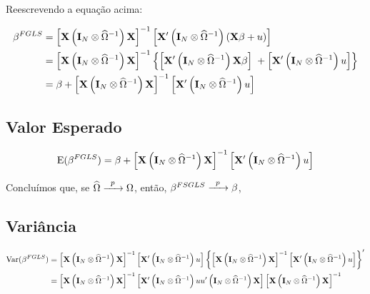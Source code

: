 \documentclass[11pt, oneside, a4paper, article]{article}
\numberwithin{equation}{section}
\begin{document}
\begin{description}
Reescrevendo a equação acima:

\vspace{-1.5 em}
\begin{align*}
\beta^{FGLS}
&= 
\left[  \mathbf{X} \left( \mathbf{I}_{N} \otimes \widehat{\Omega}^{-1} \right) \mathbf{X} \right]^{-1}
\left[  \mathbf{X}' \left( \mathbf{I}_{N} \otimes \widehat{\Omega}^{-1} \right) (\mathbf{X} \beta + u) \right]
\\
&= 
\left[ \mathbf{X} \left( \mathbf{I}_{N} \otimes \widehat{\Omega}^{-1} \right) \mathbf{X} \right]^{-1}
\left\{ 
\left[ \mathbf{X}' \left( \mathbf{I}_{N} \otimes \widehat{\Omega}^{-1} \right) \mathbf{X} \beta \right]
\; +
\left[ \mathbf{X}' \left( \mathbf{I}_{N} \otimes \widehat{\Omega}^{-1} \right) u \right]
\right\}
\\
&= 
\beta +
\left[ \mathbf{X} \left( \mathbf{I}_{N} \otimes \widehat{\Omega}^{-1} \right) \mathbf{X} \right]^{-1}
\left[ \mathbf{X}' \left( \mathbf{I}_{N} \otimes \widehat{\Omega}^{-1} \right) u \right]
\end{align*}

\subsection{Valor Esperado}

\vspace{-1 em}
\begin{align*}
\text{E}(\beta^{FGLS})
= 
\beta +
\left[ \mathbf{X} \left( \mathbf{I}_{N} \otimes \widehat{\Omega}^{-1} \right) \mathbf{X} \right]^{-1}
\left[ \mathbf{X}' \left( \mathbf{I}_{N} \otimes \widehat{\Omega}^{-1} \right) u \right]
\end{align*}

Concluímos que, se 
$\widehat{\Omega} \xrightarrow{\enskip p \enskip} \Omega$,
então,
$\beta^{FSGLS} \xrightarrow{\enskip p \enskip} \beta$,

\subsection{Variância}

\vspace{-1 em}
\begin{align*}
\text{Var}(\beta^{FGLS})
&= 
\left[ \mathbf{X} \left( \mathbf{I}_{N} \otimes \widehat{\Omega}^{-1} \right) \mathbf{X} \right]^{-1}
\left[ \mathbf{X}' \left( \mathbf{I}_{N} \otimes \widehat{\Omega}^{-1} \right) u \right]
\left\{ 
\left[ \mathbf{X} \left( \mathbf{I}_{N} \otimes \widehat{\Omega}^{-1} \right) \mathbf{X} \right]^{-1}
\left[ \mathbf{X}' \left( \mathbf{I}_{N} \otimes \widehat{\Omega}^{-1} \right) u \right]
\right\}^{\prime}
\\
&=
\left[ \mathbf{X} \left( \mathbf{I}_{N} \otimes \widehat{\Omega}^{-1} \right) \mathbf{X} \right]^{-1}
\left[
\mathbf{X}' \left( \mathbf{I}_{N} \otimes \widehat{\Omega}^{-1} \right) 
u u'
\left( \mathbf{I}_{N} \otimes \widehat{\Omega}^{-1} \right) \mathbf{X}
\right]
\left[ \mathbf{X} \left( \mathbf{I}_{N} \otimes \widehat{\Omega}^{-1} \right) \mathbf{X} \right]^{-1}
\end{align*}


\end{description}
\end{document}

